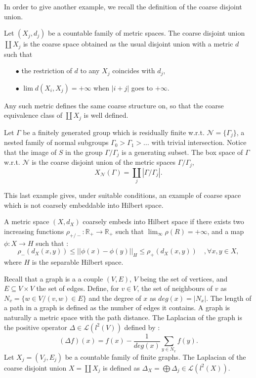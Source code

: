 
In order to give another example, we recall the definition of the coarse disjoint union.

\begin{definition}
Let $(X_j,d_j)$ be a countable family of metric spaces. The coarse disjoint union $\coprod X_j$ is the coarse space obtained as the usual disjoint union with a metric $d$ such that 
\begin{itemize}
\item[$\bullet$] the restriction of $d$ to any $X_j$ coincides with $d_j$, 
\item[$\bullet$] $\lim d(X_i,X_j)= + \infty$ when $|i+j|$ goes to $+\infty$.
\end{itemize}
Any such metric defines the same coarse structure on, so that the coarse equivalence class of $\coprod X_j$ is well defined. 
\end{definition}

\begin{Expl}
Let $\Gamma$ be a finitely generated group which is residually finite w.r.t. $\mathcal N=\{\Gamma_j\}$, a nested family of normal subgroups $\Gamma_0 > \Gamma_1>...$ with trivial intersection. Notice that the image of $S$ in the group $\Gamma / \Gamma_j$ is a generating subset. The box space of $\Gamma$ w.r.t. $\mathcal N$ is the coarse disjoint union of the metric spaces $\Gamma/\Gamma_j$,
\[X_{\mathcal N}(\Gamma)=\coprod_j |\Gamma/\Gamma_j|.\]
\end{Expl}

This last example gives, under suitable conditions, an example of coarse space which is not coarsely embeddable into Hilbert space.

\begin{definition}
A metric space $(X,d_X)$ coarsely embeds into Hilbert space if there exists two increasing functions $\rho_{+/-}: \mathbb R_+\rightarrow \mathbb R_+$ such that $\lim_{\infty} \rho(R) = +\infty$, and a map $\phi : X\rightarrow H$ such that :
\[\rho_-(d_X(x,y))\leq ||\phi(x)-\phi(y)||_H \leq \rho_+(d_X(x,y))\quad,\forall x,y\in X,\]
where $H$ is the separable Hilbert space.\\
\end{definition}

Recall that a graph is a a couple $(V,E)$, $V$ being the set of vertices, and $E\subseteq V\times V$ the set of edges. Define, for $v\in V$, the set of neighbours of $v$ as $N_v=\{w\in V / (v,w)\in E\}$ and the degree of $x$ as $deg(x)=|N_x|$. The length of a path in a graph is defined as the number of edges it contains. A graph is naturally a metric space with the path distance. The Laplacian of the graph is the positive operator $\Delta \in\mathcal L(l^2(V))$ defined by :
\[(\Delta f) (x) = f(x) - \frac{1}{deg(x)}\sum_{y\in N_x} f(y) .\] 
Let $X_j = (V_j,E_j)$ be a countable family of finite graphs. The Laplacian of the coarse disjoint union $X=\coprod X_j$ is defined as $\Delta_X = \bigoplus \Delta_j \in \mathcal L(l^2(X))$.
 
